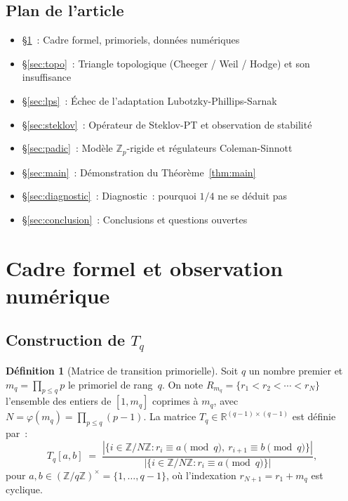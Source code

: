 \documentclass[11pt,a4paper]{article}
\theoremstyle{definition}
\newtheorem{definition}[theorem]{Définition}
\newcommand{\Z}{\mathbb{Z}}
\newcommand{\R}{\mathbb{R}}
\begin{document}
\subsection{Plan de l'article}

\begin{itemize}
  \item §\ref{sec:setup}~: Cadre formel, primoriels, données numériques
  \item §\ref{sec:topo}~: Triangle topologique (Cheeger / Weil / Hodge) et son insuffisance
  \item §\ref{sec:lps}~: Échec de l'adaptation Lubotzky-Phillips-Sarnak
  \item §\ref{sec:steklov}~: Opérateur de Steklov-PT et observation de stabilité
  \item §\ref{sec:padic}~: Modèle $\Z_p$-rigide et régulateurs Coleman-Sinnott
  \item §\ref{sec:main}~: Démonstration du Théorème~\ref{thm:main}
  \item §\ref{sec:diagnostic}~: Diagnostic~: pourquoi $1/4$ ne se déduit pas
  \item §\ref{sec:conclusion}~: Conclusions et questions ouvertes
\end{itemize}

\section{Cadre formel et observation numérique}
\label{sec:setup}

\subsection{Construction de \texorpdfstring{$T_q$}{Tq}}

\begin{definition}[Matrice de transition primorielle]
\label{def:Tq}
Soit $q$ un nombre premier et $m_q = \prod_{p\leq q} p$ le primoriel
de rang~$q$. On note $R_{m_q} = \{r_1 < r_2 < \cdots < r_N\}$
l'ensemble des entiers de $[1, m_q]$ coprimes à $m_q$, avec
$N = \varphi(m_q) = \prod_{p\leq q}(p-1)$. La matrice
$T_q \in \R^{(q-1)\times(q-1)}$ est définie par~:
\begin{equation}
  T_q[a,b] \;=\;
  \frac{|\{i\in\Z/N\Z : r_i \equiv a \pmod q,\ r_{i+1}\equiv b\pmod q\}|}
       {|\{i\in\Z/N\Z : r_i \equiv a \pmod q\}|},
\end{equation}
pour $a,b\in (\Z/q\Z)^\times = \{1,\ldots,q-1\}$, où l'indexation
$r_{N+1} = r_1 + m_q$ est cyclique.
\end{definition}
\end{document}
